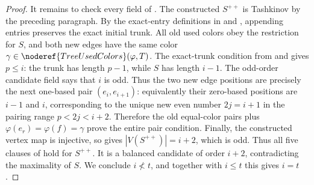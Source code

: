\begin{proof}
It remains to check every field of
.  The constructed $S^{++}$ is Tashkinov
by the preceding paragraph.  By the exact-entry definitions in
 and ,
appending entries preserves the exact initial trunk.  All old used colors
obey the restriction for $S$, and both new edges have the same color
$\gamma\in\noderef{TreeUsedColors}(\varphi,T)$.  The exact-trunk condition
from  and
 gives $p\le i$: the trunk has length
$p-1$, while $S$ has length $i-1$.  The odd-order candidate field says that
$i$ is odd.  Thus the two new edge positions are precisely the next one-based pair
$(e_i,e_{i+1})$: equivalently their zero-based positions are $i-1$ and
$i$, corresponding to the unique new even number $2j=i+1$ in the pairing
range $p<2j<i+2$.  Therefore the old equal-color pairs plus
$\varphi(e_r)=\varphi(f)=\gamma$ prove the entire pair condition.  Finally,
the constructed vertex map is injective, so
 gives $|V(S^{++})|=i+2$, which is odd.
Thus all five clauses of  hold for
$S^{++}$.  It is a balanced candidate of order $i+2$, contradicting the
maximality of $S$.  We conclude
$i\not<t$, and together with $i\le t$ this gives $i=t$.
\end{proof}
